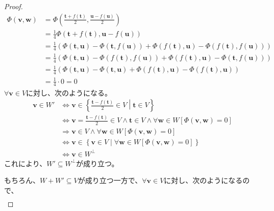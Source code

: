 \documentclass[dvipdfmx]{jsarticle}
\begin{document}
\begin{proof}
\begin{align*}
\varPhi\left( \mathbf{v},\mathbf{w} \right) &= \varPhi\left( \frac{\mathbf{t} + f\left( \mathbf{t} \right)}{2},\frac{\mathbf{u} - f\left( \mathbf{u} \right)}{2} \right)\\
&= \frac{1}{4}\varPhi\left( \mathbf{t} + f\left( \mathbf{t} \right),\mathbf{u} - f\left( \mathbf{u} \right) \right)\\
&= \frac{1}{4}\left( \varPhi\left( \mathbf{t},\mathbf{u} \right) - \varPhi\left( \mathbf{t},f\left( \mathbf{u} \right) \right) + \varPhi\left( f\left( \mathbf{t} \right),\mathbf{u} \right) - \varPhi\left( f\left( \mathbf{t} \right),f\left( \mathbf{u} \right) \right) \right)\\
&= \frac{1}{4}\left( \varPhi\left( \mathbf{t},\mathbf{u} \right) - \varPhi\left( f\left( \mathbf{t} \right),f\left( \mathbf{u} \right) \right) + \varPhi\left( f\left( \mathbf{t} \right),\mathbf{u} \right) - \varPhi\left( \mathbf{t},f\left( \mathbf{u} \right) \right) \right)\\
&= \frac{1}{4}\left( \varPhi\left( \mathbf{t},\mathbf{u} \right) - \varPhi\left( \mathbf{t},\mathbf{u} \right) + \varPhi\left( f\left( \mathbf{t} \right),\mathbf{u} \right) - \varPhi\left( f\left( \mathbf{t} \right),\mathbf{u} \right) \right)\\
&= \frac{1}{4} \cdot 0 = 0
\end{align*}
$\forall\mathbf{v} \in V$に対し、次のようになる。
\begin{align*}
\mathbf{v} \in W' &\Leftrightarrow \mathbf{v} \in \left\{ \frac{\mathbf{t} - f\left( \mathbf{t} \right)}{2} \in V \middle| \mathbf{t} \in V \right\}\\
&\Leftrightarrow \mathbf{v} =\frac{\mathbf{t} - f\left( \mathbf{t} \right)}{2} \in V \land \mathbf{t} \in V \land \forall\mathbf{w} \in W\left[ \varPhi\left( \mathbf{v},\mathbf{w} \right) = 0 \right]\\
&\Rightarrow \mathbf{v} \in V \land \forall\mathbf{w} \in W\left[ \varPhi\left( \mathbf{v},\mathbf{w} \right) = 0 \right]\\
&\Leftrightarrow \mathbf{v} \in \left\{ \mathbf{v} \in V \middle| \forall\mathbf{w} \in W\left[ \varPhi\left( \mathbf{v},\mathbf{w} \right) = 0 \right] \right\}\\
&\Leftrightarrow \mathbf{v} \in W^{\bot}
\end{align*}
これにより、$W' \subseteq W^{\bot}$が成り立つ。\par
もちろん、$W + W' \subseteq V$が成り立つ一方で、$\forall\mathbf{v} \in V$に対し、次のようになるので、
\begin{align*}

\end{align*}
\end{proof}
\end{document}
